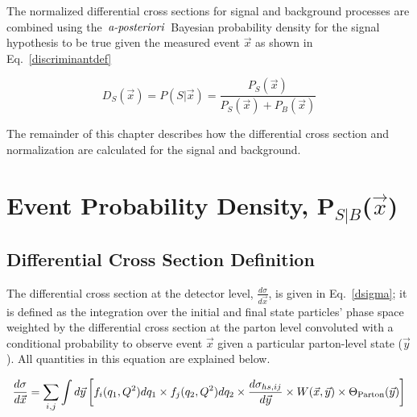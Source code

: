 The normalized differential cross sections for signal and background processes are combined using the~$\emph{a-posteriori}$~Bayesian probability density for the signal hypothesis to be true given the measured event $\vec{x}$ as shown in Eq.~\ref{discriminantdef}

\begin{equation}
\label{discriminantdef}
D_{S}(\vec{x}) = P(S|\vec{x}) = \frac{P_S(\vec{x})}{P_S(\vec{x}) + P_B(\vec{x})}
\end{equation}

The remainder of this chapter describes how the differential cross section and normalization are calculated for the signal and background.

\section{Event Probability Density, P$_{S|B}$($\vec{x}$)}
\label{epd}

\subsection{Differential Cross Section Definition}
\label{diffcrosssection}

The differential cross section at the detector level, $\frac{d\sigma}{d\vec{x}}$, is given in
Eq.~\ref{dsigma}; it is defined as the integration over the initial and final state particles' phase space weighted by the differential cross section at the parton level convoluted with a conditional probability to observe event $\vec{x}$ given a particular parton-level state ($\vec{y}$). All quantities in this equation are explained below.

\begin{equation}
\label{dsigma}
\frac{d\sigma}{d\vec{x}} = \sum_{i,j} \int d\vec{y}
\left[ f_{i}(q_{1}, Q^{2})dq_{1}
\times f_{j}(q_{2}, Q^{2})dq_{2}
\times \frac{d\sigma_{hs,ij}}{d\vec{y}}
\times W(\vec{x},\vec{y})
\times \Theta_{\rm{Parton}}(\vec{y}) \right]
\end{equation}


